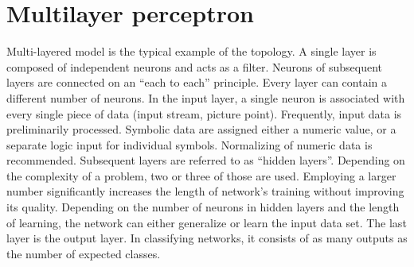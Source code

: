 \documentclass[10pt,oneside]{memoir}
\begin{document}
\section{Multilayer perceptron}
\label{multilayerperceptron}

Multi-layered model is the typical example of the topology. A single layer is composed of independent neurons and acts as a filter. Neurons of subsequent layers are connected on an ``each to each'' principle. Every layer can contain a different number of neurons. In the input layer, a single neuron is associated with every single piece of data (input stream, picture point). Frequently, input data is preliminarily processed. Symbolic data are assigned either a numeric value, or a separate logic input for individual symbols. Normalizing of numeric data is recommended. Subsequent layers are referred to as ``hidden layers''. Depending on the complexity of a problem, two or three of those are used. Employing a larger number significantly increases the length of network's training without improving its quality. Depending on the number of neurons in hidden layers and the length of learning, the network can either generalize or learn the input data set. The last layer is the output layer. In classifying networks, it consists of as many outputs as the number of expected classes.


\begin{figure}
\begin{center}
\end{center}
\label{figure7}
\end{figure}
\end{document}
